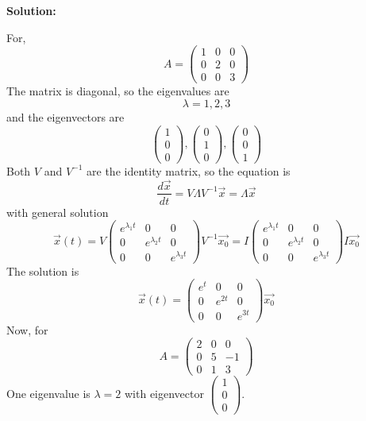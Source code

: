 \documentclass[12pt]{article}
\newenvironment{solution}{
    \textbf{Solution:}
    
}{
    
    \vspace{2em}
}
\begin{document}
\begin{solution}
    For,
    \[
        A = \begin{pmatrix}
            1 & 0 & 0 \\
            0 & 2 & 0 \\
            0 & 0 & 3
        \end{pmatrix}
    \]
    The matrix is diagonal, so the eigenvalues are
    \[
        \lambda = 1, 2, 3
    \]
    and the eigenvectors are
    \[
        \begin{pmatrix} 1 \\ 0 \\ 0 \end{pmatrix}, \begin{pmatrix} 0 \\ 1 \\ 0 \end{pmatrix}, \begin{pmatrix} 0 \\ 0 \\ 1 \end{pmatrix}
    \]
    Both \(V\) and \(V^{-1}\) are the identity matrix, so the equation is
    \[
        \frac{d\vec{x}}{dt} = V \Lambda V^{-1} \vec{x} = \Lambda \vec{x}
    \]
    with general solution
    \[
        \vec{x}(t) = V \begin{pmatrix} e^{\lambda_1 t} & 0 & 0 \\ 0 & e^{\lambda_2 t} & 0 \\ 0 & 0 & e^{\lambda_3 t} \end{pmatrix} V^{-1} \vec{x_0} = I \begin{pmatrix} e^{\lambda_1 t} & 0 & 0 \\ 0 & e^{\lambda_2 t} & 0 \\ 0 & 0 & e^{\lambda_3 t} \end{pmatrix} I \vec{x_0}
    \]
    The solution is
    \[
        \vec{x}(t) = \begin{pmatrix} e^t & 0 & 0 \\ 0 & e^{2t} & 0 \\ 0 & 0 & e^{3t} \end{pmatrix} \vec{x_0}
    \]
    Now, for 
    \[
        A = \begin{pmatrix}
            2 & 0 & 0 \\
            0 & 5 & -1 \\
            0 & 1 & 3
        \end{pmatrix}
    \]
    One eigenvalue is \(\lambda = 2\) with eigenvector \(\begin{pmatrix} 1 \\ 0 \\ 0 \end{pmatrix}\).


\end{solution}
\end{document}
